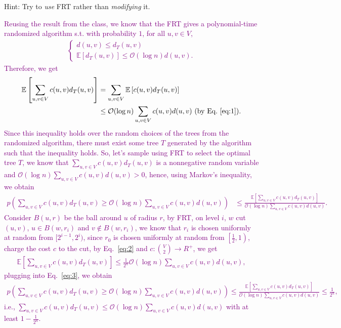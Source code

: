 \documentclass[11pt]{article}
\begin{document}
Hint: Try to \emph{use} FRT rather than \emph{modifying} it.

\textcolor{purple}{
    Reusing the result from the class, we know that the FRT gives a polynomial-time randomized algorithm s.t. with probability $1$, for all $u,v \in V$,
    \begin{align}\label{eq:1}
        \begin{cases} 
            d(u,v) \leq d_T(u,v)\\ 
            \mathbb{E}\left[d_T(u,v)\right] \leq \mathcal{O}(\log n) d(u,v).
        \end{cases}
    \end{align}
    Therefore, we get
    \begin{align}\label{eq:2}
        \mathbb{E}\left[\sum_{u,v \in V} c(u,v) d_T(u,v)\right] &= \sum_{u,v \in V} \mathbb{E}\left[c(u,v) d_T(u,v)\right]\nonumber\\
        &\leq \mathcal{O}(\log n)  \sum_{u,v \in V} c(u,v) d(u,v) \text{ (by Eq.~\ref{eq:1})}.
    \end{align}
    Since this inequality holds over the random choices of the trees from the randomized algorithm, there must exist some tree $T$ generated by the algorithm such that the inequality holds. So, let's sample using FRT to select the optimal tree $T$, we know that $\sum_{u,v \in V} c(u,v) d_T(u,v)$ is a nonnegative random variable and $\mathcal{O}(\log n)  \sum_{u,v \in V} c(u,v) d(u,v)>0$, hence, using Markov’s inequality, we obtain
    \begin{align}\label{eq:3}
        p\left(\sum_{u,v \in V} c(u,v) d_T(u,v) \geq \mathcal{O}(\log n)  \sum_{u,v \in V} c(u,v) d(u,v)\right) &\leq \frac{\mathbb{E}\left[\sum_{u,v \in V} c(u,v) d_T(u,v)\right]}{\mathcal{O}(\log n)  \sum_{u,v \in V} c(u,v) d(u,v)}.
    \end{align}
    Consider $B(u,r)$ be the ball around $u$ of radius $r$, by FRT, on level $i$, $w$ cut $(u,v)$, $u\in B(w,r_i)$ and $v\notin B(w,r_i)$, we know that $r_i$ is chosen uniformly at random from $[2^{i-1},2^{i})$, since $r_0$ is chosen uniformly at random from $\left[\frac{1}{2},1\right)$, charge the cost $c$ to the cut, by Eq.~\ref{eq:2} and $c : {V \choose 2} \rightarrow R^+$, we get
    \begin{align}
        \mathbb{E}\left[\sum_{u,v \in V} c(u,v) d_T(u,v)\right]\leq \frac{1}{2^n} \mathcal{O}(\log n)  \sum_{u,v \in V} c(u,v) d(u,v),        
    \end{align}
    plugging into Eq.~\ref{eq:3}, we obtain
    \begin{align}
        p\left(\sum_{u,v \in V} c(u,v) d_T(u,v) \geq \mathcal{O}(\log n)  \sum_{u,v \in V} c(u,v) d(u,v)\right) \leq \frac{\mathbb{E}\left[\sum_{u,v \in V} c(u,v) d_T(u,v)\right]}{\mathcal{O}(\log n)  \sum_{u,v \in V} c(u,v) d(u,v)} \leq \frac{1}{2^n},
    \end{align}
    i.e., $\sum_{u,v \in V} c(u,v) d_T(u,v) \leq \mathcal{O}(\log n)  \sum_{u,v \in V} c(u,v) d(u,v)$ with at least $1 - \frac{1}{2^n}$.\\
}
\end{document}
